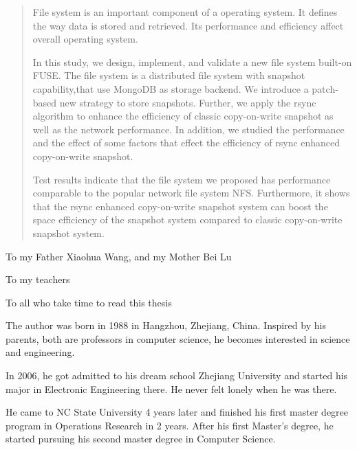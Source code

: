 \begin{abstract}

File system is an important component of a operating system. It defines the way data is stored and retrieved. Its performance and efficiency affect overall operating system.

In this study, we design, implement, and validate a new file system built-on FUSE. The file system is a distributed file system with snapshot capability,that use MongoDB as storage backend. We introduce a patch-based new strategy to store snapshots. Further, we apply the rsync algorithm to enhance the efficiency of classic copy-on-write snapshot as well as the network performance. In addition, we studied the performance and the effect of some factors that effect the efficiency of rsync enhanced copy-on-write snapshot.

Test results indicate that the file system we proposed has performance comparable to the popular network file system NFS. Furthermore, it shows that the rsync enhanced copy-on-write snapshot system can boost the space efficiency of the snapshot system compared to classic copy-on-write snapshot system. 

\end{abstract}

\makecopyrightpage

\maketitlepage

\begin{dedication}
 \centering To my Father Xiaohua Wang, and my Mother Bei Lu

 \centering To my teachers

 \centering To all who take time to read this thesis
\end{dedication}

\begin{biography}

    The author was born in 1988 in Hangzhou, Zhejiang, China. Inspired by his parents, both are professors in computer science, he becomes interested in science and engineering.

    In 2006, he got admitted to his dream school Zhejiang University and started his major in Electronic Engineering there. He never felt lonely when he was there.

    He came to NC State University 4 years later and finished his first master degree program in Operations Research in 2 years. After his first Master's degree, he started pursuing his second master degree in Computer Science.

\end{biography}

